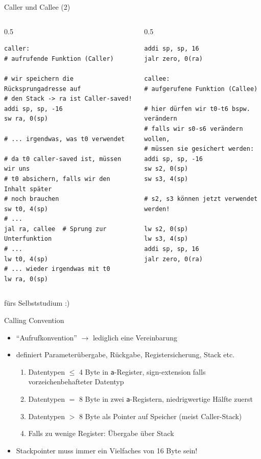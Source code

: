 \begin{frame}[c, fragile]{Caller und Callee (2)}{}
	\begin{columns}[c]
		\hspace*{0.25cm}
		\begin{column}{0.5\textwidth}
			\begin{verbatim}
caller:
# aufrufende Funktion (Caller)

# wir speichern die Rücksprungadresse auf
# den Stack -> ra ist Caller-saved!
addi sp, sp, -16
sw ra, 0(sp)

# ... irgendwas, was t0 verwendet

# da t0 caller-saved ist, müssen wir uns
# t0 absichern, falls wir den Inhalt später
# noch brauchen
sw t0, 4(sp)
# ...
jal ra, callee  # Sprung zur Unterfunktion
# ...
lw t0, 4(sp)
# ... wieder irgendwas mit t0
lw ra, 0(sp)
        \end{verbatim}
		\end{column}
		\begin{column}{0.5\textwidth}
			\begin{verbatim}
addi sp, sp, 16
jalr zero, 0(ra)

callee:
# aufgerufene Funktion (Callee)

# hier dürfen wir t0-t6 bspw. verändern
# falls wir s0-s6 verändern wollen,
# müssen sie gesichert werden:
addi sp, sp, -16
sw s2, 0(sp)
sw s3, 4(sp)

# s2, s3 können jetzt verwendet werden!

lw s2, 0(sp)
lw s3, 4(sp)
addi sp, sp, 16
jalr zero, 0(ra)
      \end{verbatim}
		\end{column}
	\end{columns}
	\begin{center}
		\small{fürs Selbststudium :)}
	\end{center}
\end{frame}

\begin{frame}[c, fragile]{Calling Convention}{}
	\begin{itemize}
		\item \enquote{Aufrufkonvention} $\rightarrow$ lediglich eine Vereinbarung
		\item definiert Parameterübergabe, Rückgabe, Registersicherung, Stack etc.
		      \begin{enumerate}
			      \item Datentypen $\le$ 4 Byte in \texttt{a}-Register, sign-extension falls vorzeichenbehafteter Datentyp
			      \item Datentypen $=$ 8 Byte in zwei \texttt{a}-Registern, niedrigwertige Hälfte zuerst
			      \item Datentypen $>$ 8 Byte als Pointer auf Speicher (meist Caller-Stack)
			      \item Falls zu wenige Register: Übergabe über Stack
		      \end{enumerate}
		\item Stackpointer muss immer ein Vielfaches von 16 Byte sein!
	\end{itemize}
\end{frame}

